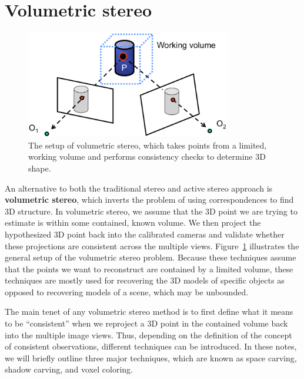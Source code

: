 \documentclass[a4paper, 12pt]{article}
\renewcommand\emph{\textbf}
\numberwithin{equation}{section}
\begin{document}
\section{Volumetric stereo}
\begin{figure}[h!]
    \centering
    \includegraphics[width = 0.8\textwidth]{figures/volumetric_setup.png}
    \caption{The setup of volumetric stereo, which takes points from a limited, working volume and performs consistency checks to determine 3D shape.}
    \label{fig:volumetric_setup}
\end{figure}
An alternative to both the traditional stereo and active stereo approach is \emph{volumetric stereo}, which inverts the problem of using correspondences to find 3D structure. In volumetric stereo, we assume that the 3D point we are trying to estimate is within some contained, known volume. We then project the hypothesized 3D point back into the calibrated cameras and validate whether these projections are consistent across the multiple views. Figure~\ref{fig:volumetric_setup} illustrates the general setup of the volumetric stereo problem. Because these techniques assume that the points we want to reconstruct are contained by a limited volume, these techniques are mostly used for recovering the 3D models of specific objects as opposed to recovering models of a scene, which may be unbounded. 

The main tenet of any volumetric stereo method is to first define what it means to be ``consistent'' when we reproject a 3D point in the contained volume back into the multiple image views. Thus, depending on the definition of the concept of consistent observations, different techniques can be introduced. In these notes, we will briefly outline three major techniques, which are known as space carving, shadow carving, and voxel coloring.
\end{document}

